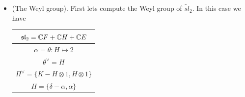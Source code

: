 \begin{itemize}
Then we see that $(K|d)=1$ and by definition 
we have $\nu(K) = \delta$. We also define $\Lambda_0 = \nu(d)$, so we have 
\begin{equation}
    \begin{aligned}
        &(\delta|\delta) = (d|d) = 0\\
        &(\Lambda_0|\Lambda_0) = (K|K) = 0\\
        &(\Lambda_0|\delta) = (K|d) = 1
    \end{aligned}
\end{equation}

Now we determine $(\cdot|\cdot)$ on $\widetilde{g}$. It's sufficient to determine the pairing where it's different from zero. So we 
calculate $(x\otimes t^j|y\otimes t^{-j}), (x,y)\in\fr{g}_\alpha\times\fr{g}_{-\alpha}$:
\begin{equation}
    \begin{split}
    \langle\alpha,H_i\rangle(x|y)&=([H_i,x]|y)\\
    &=(H_i\otimes1|[x,y]\otimes1)\\
    &=([H_i,x]\otimes t^j|y\otimes t^{-j})\\
    &=\langle\alpha,H_i\rangle (x\otimes t^j|y\otimes t^{-j})
    \end{split}
\end{equation}
If $\alpha\neq0$, then $\alpha(H_i)\neq0$ for some $i$ and we are done. So we conclude that 
\begin{equation}
    (x\otimes t^m|y\otimes t^n) = \delta_{m,-n}(x|y).
\end{equation}
This is compatible with the general expression:
\begin{equation}
    (x\otimes P|y\otimes Q) = \text{Res}_t(t^{-1}PQ)(x|y).
\end{equation}
\item (The Weyl group). First lets compute the Weyl group of $\widetilde{sl}_2$. In this case we have 
\begin{center}
    \begin{tabular}{|c|}
        \hline 
        $\mathfrak{sl}_2 = \mathbb{C} F+\mathbb{C} H + \mathbb{C} E$\\
        \hline 
        $\alpha = \theta: H\mapsto 2$\\
        \hline
        $\theta^\vee = H$\\
        \hline
        $\Pi^\vee = \{K-H\otimes1,H\otimes1\}$\\
        \hline
        $\Pi=\{\delta-\alpha, \alpha\}$\\
        \hline
    \end{tabular}

\end{center}
\end{itemize}
